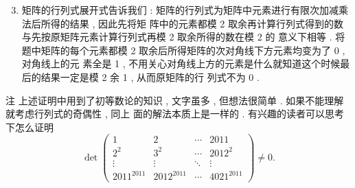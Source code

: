 \documentclass[10pt]{article}
\begin{document}
\begin{enumerate}
  \setcounter{enumi}{2}
  \item  矩阵的行列式展开式告诉我们 :  矩阵的行列式为矩阵中元素进行有限次加减乘法后所得的结果 ,  因此先将矩   阵中的元素都模  2  取余再计算行列式得到的数与先按原矩阵元素计算行列式再模  2  取余所得的数在模  2  的   意义下相等 .  将题中矩阵的每个元素都模  2  取余后所得矩阵的次对角线下方元素均变为了  0 ,  对角线上的元   素全是  1 ,  不用关心对角线上方的元素是什么就知道这个时候最后的结果一定是模  2  余  1 ,  从而原矩阵的行   列式不为  0 .
\end{enumerate}
 注   上述证明中用到了初等数论的知识 ,  文字虽多 ,  但想法很简单 .  如果不能理解就考虑行列式的奇偶性 ,  同上   面的解法本质上是一样的 .  有兴趣的读者可以思考下怎么证明 
$$
\operatorname{det}\left(\begin{array}{cccc}
1 & 2 & \cdots & 2011 \\
2^{2} & 3^{2} & \cdots & 2012^{2} \\
\vdots & \vdots & \ddots & \vdots \\
2011^{2011} & 2012^{2011} & \cdots & 4021^{2011}
\end{array}\right) \neq 0 .
$$
\end{document}
